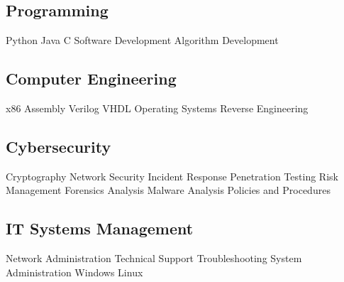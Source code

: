 

\subsection{Programming}

Python \textbullet{}
Java \textbullet{}
C \textbullet{}
Software Development \textbullet{}
Algorithm Development

\sectionspace


\subsection{Computer Engineering}

x86 Assembly \textbullet{}
Verilog \textbullet{}
VHDL \textbullet{}
Operating Systems \textbullet{}
Reverse Engineering

\sectionspace


\subsection{Cybersecurity}

Cryptography \textbullet{}
Network Security \textbullet{}
Incident Response %
Penetration Testing \textbullet{}
Risk Management \textbullet{}
Forensics Analysis \textbullet{}
Malware Analysis \textbullet{}
Policies and Procedures %

\sectionspace


\subsection{IT Systems Management}

Network Administration \textbullet{}
Technical Support \textbullet{}
Troubleshooting \textbullet{}
System Administration \textbullet{}
Windows \textbullet{}
Linux %

\sectionspace

